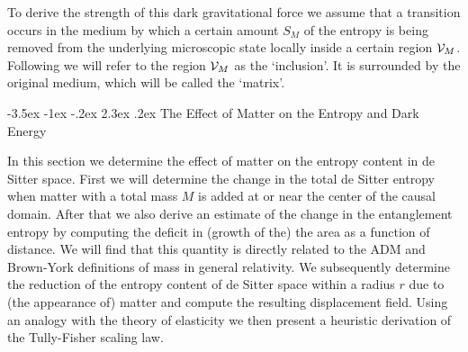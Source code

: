 \documentclass[a4paper,12pt]{article}
\makeatletter
\renewcommand\section{\@startsection {section}{1}{\z@}%
                                   {-3.5ex \@plus -1ex \@minus -.2ex}%
                                   {2.3ex \@plus.2ex}%
                                   {\normalfont\large\bfseries}}
\makeatother
\begin{document}
To derive the strength of this dark gravitational force  we assume that a transition occurs in the 
medium by which a certain amount $S_M$ of 
the entropy is being removed from the underlying 
microscopic state locally inside 
a certain region ${\cal V}_M$. 
Following \cite{Eshelby} we will refer to the region  ${\cal V}_M$ 
as the `inclusion'.  It is surrounded by the original medium, which will be called the 
`matrix'. 





\section{The Effect of Matter on the Entropy and Dark Energy}


In this section we determine the effect of matter on the entropy content in de Sitter space. First we will determine the change in the total de Sitter entropy when matter with a total mass $M$ is added at or near the center of the causal domain. After that we also derive an estimate of the change in the entanglement entropy by computing the deficit in (growth of the) the area as a function of distance.  We will find that this quantity is directly related to the ADM and Brown-York definitions of mass in general relativity. We subsequently determine the reduction of the entropy content of de Sitter space within a radius $r$ due to (the appearance of) matter and compute the resulting displacement field. Using an analogy with the theory of elasticity we then present a heuristic derivation of the Tully-Fisher scaling law. 

\end{document}
